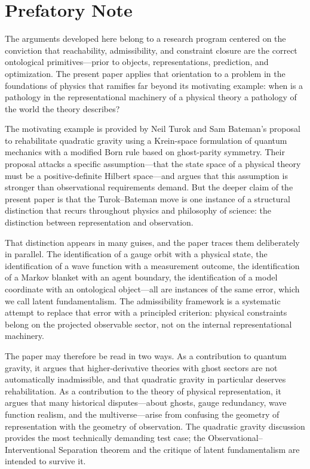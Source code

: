 \documentclass[12pt,a4paper]{article}
\theoremstyle{remark}
\begin{document}
\tableofcontents
\newpage

\section*{Prefatory Note}

The arguments developed here belong to a research program centered on the
conviction that reachability, admissibility, and constraint closure are the
correct ontological primitives---prior to objects, representations,
prediction, and optimization. The present paper applies that orientation to
a problem in the foundations of physics that ramifies far beyond its
motivating example: when is a pathology in the representational machinery
of a physical theory a pathology of the world the theory describes?

The motivating example is provided by Neil Turok and Sam Bateman's proposal
to rehabilitate quadratic gravity using a Krein-space formulation of quantum
mechanics with a modified Born rule based on ghost-parity symmetry. Their
proposal attacks a specific assumption---that the state space of a physical
theory must be a positive-definite Hilbert space---and argues that this
assumption is stronger than observational requirements demand. But the
deeper claim of the present paper is that the Turok--Bateman move is one
instance of a structural distinction that recurs throughout physics and
philosophy of science: the distinction between representation and observation.

That distinction appears in many guises, and the paper traces them
deliberately in parallel. The identification of a gauge orbit with a
physical state, the identification of a wave function with a measurement
outcome, the identification of a Markov blanket with an agent boundary,
the identification of a model coordinate with an ontological object---all
are instances of the same error, which we call latent fundamentalism. The
admissibility framework is a systematic attempt to replace that error with
a principled criterion: physical constraints belong on the projected
observable sector, not on the internal representational machinery.

The paper may therefore be read in two ways. As a contribution to quantum
gravity, it argues that higher-derivative theories with ghost sectors are
not automatically inadmissible, and that quadratic gravity in particular
deserves rehabilitation. As a contribution to the theory of physical
representation, it argues that many historical disputes---about ghosts,
gauge redundancy, wave function realism, and the multiverse---arise from
confusing the geometry of representation with the geometry of observation.
The quadratic gravity discussion provides the most technically demanding
test case; the Observational--Interventional Separation theorem and the
critique of latent fundamentalism are intended to survive it.
\end{document}
